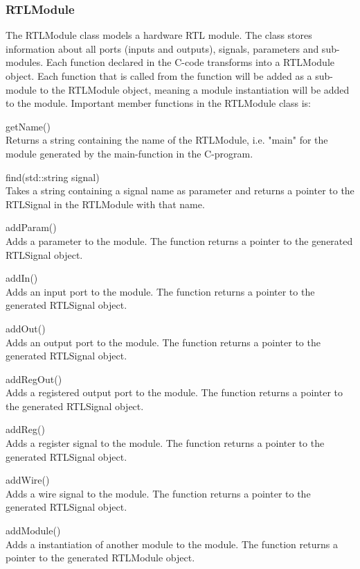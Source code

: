 \subsubsection{RTLModule}
The RTLModule class models a hardware RTL module. The class stores information about all ports (inputs and outputs), signals, parameters and sub-modules. Each function declared in the C-code transforms into a RTLModule object. Each function that is called from the function will be added as a sub-module to the RTLModule object, meaning a module instantiation will be added to the module. Important member functions in the RTLModule class is:
\begin{compactdesc}
    \item[getName()] \hfill \\
    Returns a string containing the name of the RTLModule, i.e. "main" for the module generated by the main-function in the C-program.
    \item[find(std::string signal)] \hfill \\
    Takes a string containing a signal name as parameter and returns a pointer to the RTLSignal in the RTLModule with that name.
    \item[addParam()] \hfill \\
    Adds a parameter to the module. The function returns a pointer to the generated RTLSignal object.
    \item[addIn()] \hfill \\
    Adds an input port to the module. The function returns a pointer to the generated RTLSignal object.
    \item[addOut()] \hfill \\
    Adds an output port to the module. The function returns a pointer to the generated RTLSignal object.
    \item[addRegOut()] \hfill \\
    Adds a registered output port to the module. The function returns a pointer to the generated RTLSignal object.
    \item[addReg()] \hfill \\
    Adds a register signal to the module. The function returns a pointer to the generated RTLSignal object.
    \item[addWire()] \hfill \\
    Adds a wire signal to the module. The function returns a pointer to the generated RTLSignal object.
    \item[addModule()] \hfill \\
    Adds a instantiation of another module to the module. The function returns a pointer to the generated RTLModule
    object.
\end{compactdesc}
